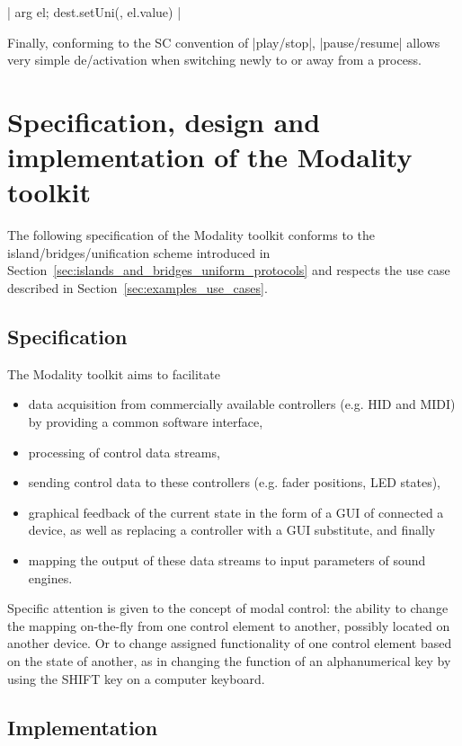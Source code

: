 \documentclass{article}
\begin{document}
|{ arg el; dest.setUni(\amp, el.value) }|

Finally, conforming to the SC convention of |play/stop|, |pause/resume| allows very simple de/activation when switching newly to or away from a process. 


\section{Specification, design and implementation of the Modality toolkit}
\label{sec:implementation}

The following specification of the Modality toolkit conforms to the island/bridges/unification scheme introduced in Section~\ref{sec:islands_and_bridges_uniform_protocols}
and respects the use case described in Section~\ref{sec:examples_use_cases}.

\subsection{Specification}
\label{sub:specification}

The Modality toolkit aims to facilitate
\begin{itemize}\itemsep0em
	\item data acquisition from commercially available controllers (e.g. HID and MIDI) by providing a common software interface,
	\item processing of control data streams,
	\item sending control data to these controllers (e.g. fader positions, LED states),
	\item graphical feedback  of the current state in the form of a GUI of connected a device, as well as replacing a controller with a GUI substitute, and finally
	\item mapping the output of these data streams to input parameters of sound engines.
\end{itemize}

Specific attention is given to the concept of modal control: the ability to change the mapping on-the-fly from one control element to another, possibly located on another device.
Or to change assigned functionality of one control element based on the state of another, as in changing the function of an alphanumerical key by using the SHIFT key on a computer keyboard.

\subsection{Implementation}
\label{sub:implementation}
\end{document}
